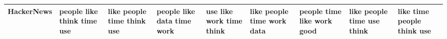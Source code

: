 \documentclass[11pt,a4paper]{article}
\begin{document}
\begin{appendices}
\begin{table*}[htb]
\begin{tiny}
\begin{tabular}{|p{}|p{}|p{}|p{}|p{}|p{}|p{}|p{}|p{}|}
    HackerNews & people \newline like \newline think \newline time \newline use & like \newline people \newline time \newline think \newline use & people \newline like \newline data \newline time \newline work & use \newline like \newline work \newline time \newline think & like \newline people \newline time \newline work \newline data & people \newline time \newline like \newline work \newline good & like \newline people \newline time \newline use \newline think & like \newline time \newline people \newline think \newline use\\\hline

\end{tabular}
\end{tiny}
\end{table*}
\end{appendices}
\end{document}
